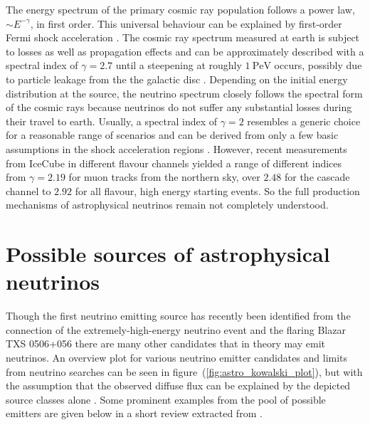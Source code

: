 The energy spectrum of the primary cosmic ray population follows a power law, $\sim E^{-\gamma}$, in first order.
This universal behaviour can be explained by first-order Fermi shock acceleration \cite{Malkov:2001tu,Baring:1997ka,BellShockAcc1,BellShockAcc2}.
The cosmic ray spectrum measured at earth is subject to losses as well as propagation effects and can be approximately described with a spectral index of $\gamma=\num{2.7}$ until a steepening at roughly $\SI{1}{\peta\eV}$ occurs, possibly due to particle leakage from the the galactic disc \cite{Moskalenko:2003en,Moskalenko:2013galprop,Gaisser:2013bla,Gaisser:2010historic,Hoerandel:2002yg,Grupen:2005rx,Gondolo:1995fq}.
Depending on the initial energy distribution at the source, the neutrino spectrum closely follows the spectral form of the cosmic rays because neutrinos do not suffer any substantial losses during their travel to earth.
Usually, a spectral index of $\gamma=2$ resembles a generic choice for a reasonable range of scenarios and can be derived from only a few basic assumptions in the shock acceleration regions \cite{Lipari:2008zf,BellShockAcc1,Gaisser:1990vg}.
However, recent measurements from IceCube in different flavour channels yielded a range of different indices from $\gamma=\num{2.19}$ \cite{Haack:2017dxi} for muon tracks from the northern sky, over $\num{2.48}$ \cite{Niederhausen:2017mjk} for the cascade channel to $\num{2.92}$ \cite{Kopper:2017zzm} for all flavour, high energy starting events.
So the full production mechanisms of astrophysical neutrinos remain not completely understood.

\section{Possible sources of astrophysical neutrinos}
Though the first neutrino emitting source has recently been identified from the connection of the extremely-high-energy neutrino event and the flaring Blazar TXS 0506+056 \cite{IceCube:2018dnn} there are many other candidates that in theory may emit neutrinos.
An overview plot for various neutrino emitter candidates and limits from neutrino searches can be seen in figure~(\ref{fig:astro_kowalski_plot}), but with the assumption that the observed diffuse flux can be explained by the depicted source classes alone \cite{Kowalski:2014zda}.
Some prominent examples from the pool of possible emitters are given below in a short review extracted from \cite{Grupen:2005rx,Gaisser:2016uoy,Meszaros:2017fcs,Dermer:2016jmw,Dermer:2006xt, Mertsch:2016hcd,Boettcher:2012ssc,Urry:1995mg}.

